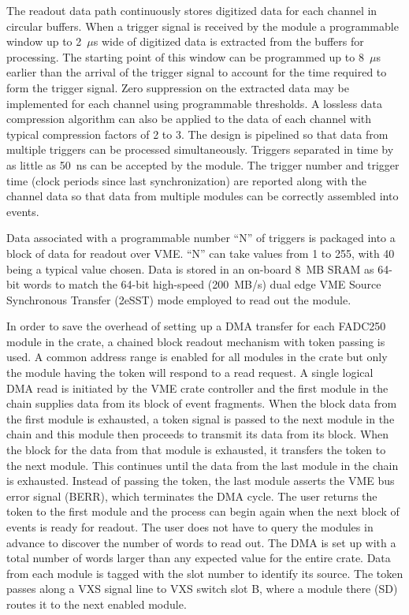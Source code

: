 The readout data path continuously stores digitized data for each channel in circular buffers. When a trigger signal is received by the module a programmable window up to 2~$\mu$s wide of digitized data is extracted from the buffers for processing. The starting point of this window can be programmed up to 8~$\mu$s earlier than the arrival of the trigger signal to account for the time required to form the trigger signal.  Zero suppression on the extracted data may be implemented for each channel using programmable thresholds.  A lossless data compression algorithm can also be applied to the data of each channel with typical compression factors of 2 to 3. The design is pipelined so that data from multiple triggers can be processed simultaneously.  Triggers separated in time by as little as 50~ns can be accepted by the module. The trigger number and trigger time (clock periods since last synchronization) are reported along with the channel data so that data from multiple modules can be correctly assembled into events. 

Data associated with a programmable number ``N'' of triggers is packaged into a block of data for readout over VME.  ``N'' can take values from 1 to 255, with 40 being a typical value chosen.  Data is stored in an on-board 8~MB SRAM as 64-bit words to match the 64-bit high-speed (200~MB/s) dual edge VME Source Synchronous Transfer (2eSST) mode employed to read out the module.  

In order to save the overhead of setting up a DMA transfer for each FADC250 module in the crate, a chained block readout mechanism with token passing is used.  A common address range is enabled for all modules in the crate but only the module having the token will respond to a read request.  A single logical DMA read is initiated by the VME crate controller and the first module in the chain supplies data from its block of event fragments.  When the block data from the first module is exhausted, a token signal is passed to the next module in the chain and this module then proceeds to transmit its data from its block.  When the block for the data from that module is exhausted, it transfers the token to the next module.  This continues until the data from the last module in the chain is exhausted.  Instead of passing the token, the last module asserts the VME bus error signal (BERR), which terminates the DMA cycle.  The user returns the token to the first module and the process can begin again when the next block of events is ready for readout.  The user does not have to query the modules in advance to discover the number of words to read out.  The DMA is set up with a total number of words larger than any expected value for the entire crate.  Data from each module is tagged with the slot number to identify its source.  The token passes along a VXS signal line to VXS switch slot B, where a module there (SD) routes it to the next enabled module.


